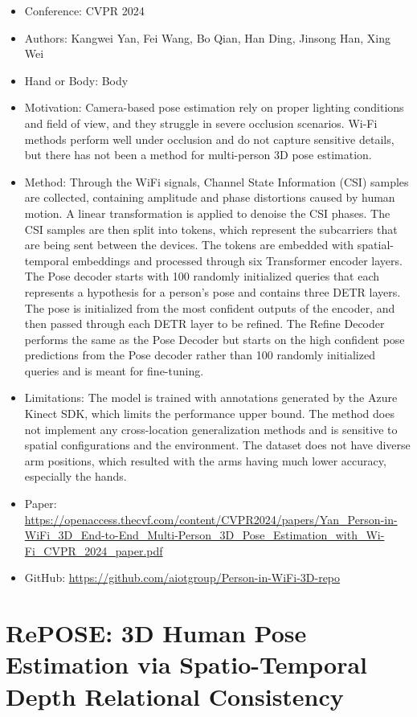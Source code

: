 \documentclass{article}
\begin{document}
\begin{itemize}
    \item Conference: CVPR 2024
    \item Authors: Kangwei Yan, Fei Wang, Bo Qian, Han Ding, Jinsong Han, Xing Wei
    \item Hand or Body: Body
    \item Motivation: Camera-based pose estimation rely on proper lighting conditions and field of view, and they struggle in severe occlusion scenarios. Wi-Fi methods perform well under occlusion and do not capture sensitive details, but there has not been a method for multi-person 3D pose estimation.
    \item Method: Through the WiFi signals, Channel State Information (CSI) samples are collected, containing amplitude and phase distortions caused by human motion. A linear transformation is applied to denoise the CSI phases. The CSI samples are then split into tokens, which represent the subcarriers that are being sent between the devices. The tokens are embedded with spatial-temporal embeddings and processed through six Transformer encoder layers. The Pose decoder starts with 100 randomly initialized queries that each represents a hypothesis for a person's pose and contains three DETR layers. The pose is initialized from the most confident outputs of the encoder, and then passed through each DETR layer to be refined. The Refine Decoder performs the same as the Pose Decoder but starts on the high confident pose predictions from the Pose decoder rather than 100 randomly initialized queries and is meant for fine-tuning.
    \item Limitations: The model is trained with annotations generated by the Azure Kinect SDK, which limits the performance upper bound. The method does not implement any cross-location generalization methods and is sensitive to spatial configurations and the environment. The dataset does not have diverse arm positions, which resulted with the arms having much lower accuracy, especially the hands.
    \item Paper: \url{https://openaccess.thecvf.com/content/CVPR2024/papers/Yan_Person-in-WiFi_3D_End-to-End_Multi-Person_3D_Pose_Estimation_with_Wi-Fi_CVPR_2024_paper.pdf}
    \item GitHub: \url{https://github.com/aiotgroup/Person-in-WiFi-3D-repo}
\end{itemize}

\section*{RePOSE: 3D Human Pose Estimation via Spatio-Temporal Depth Relational Consistency}
\end{document}

